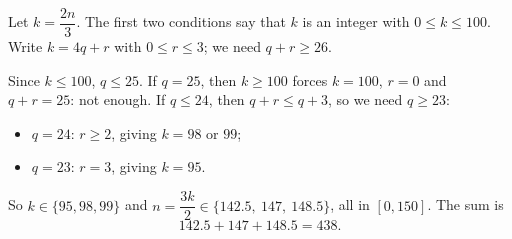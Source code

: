 Let $k=\dfrac{2n}{3}$. The first two conditions say that $k$ is an integer with $0\le k\le100$. Write $k=4q+r$ with $0\le r\le3$; we need $q+r\ge26$.

Since $k\le100$, $q\le25$. If $q=25$, then $k\ge100$ forces $k=100$, $r=0$ and $q+r=25$: not enough. If $q\le24$, then $q+r\le q+3$, so we need $q\ge23$:
\begin{itemize}
\item $q=24$: $r\ge2$, giving $k=98$ or $99$;
\item $q=23$: $r=3$, giving $k=95$.
\end{itemize}
So $k\in\{95,98,99\}$ and $n=\dfrac{3k}{2}\in\{142.5,\ 147,\ 148.5\}$, all in $[0,150]$. The sum is
\[142.5+147+148.5=\boxed{438}.\]
